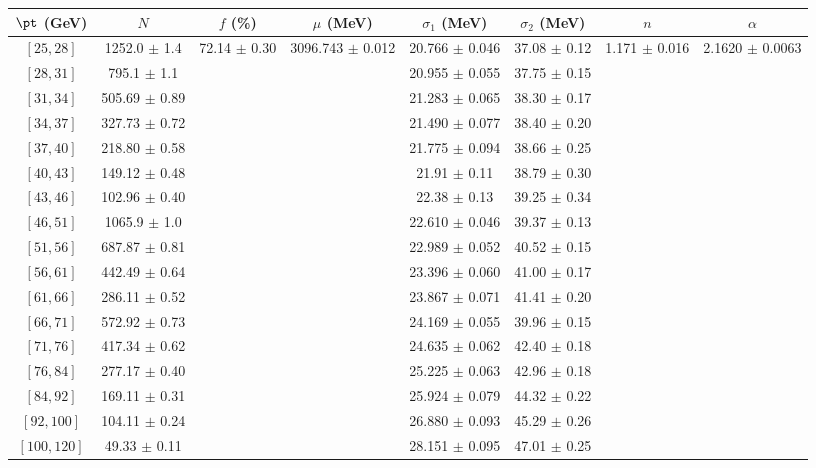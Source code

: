 \begin{tabular}{c||c|c|c|c|c|c|c}
$\pt$ (GeV) & $N$ & $f$ (\%) & $\mu$ (MeV) & $\sigma_1$ (MeV) & $\sigma_2$ (MeV) & $n$ & $\alpha$ \\
\hline
$[25, 28]$ & 1252.0 $\pm$ 1.4 & \multirow{17}{*}{72.14 $\pm$ 0.30} & \multirow{17}{*}{3096.743 $\pm$ 0.012} & 20.766 $\pm$ 0.046 & 37.08 $\pm$ 0.12 & \multirow{17}{*}{1.171 $\pm$ 0.016} & \multirow{17}{*}{2.1620 $\pm$ 0.0063}\\
$[28, 31]$ & 795.1 $\pm$ 1.1 &  &  & 20.955 $\pm$ 0.055 & 37.75 $\pm$ 0.15 &  & \\
$[31, 34]$ & 505.69 $\pm$ 0.89 &  &  & 21.283 $\pm$ 0.065 & 38.30 $\pm$ 0.17 &  & \\
$[34, 37]$ & 327.73 $\pm$ 0.72 &  &  & 21.490 $\pm$ 0.077 & 38.40 $\pm$ 0.20 &  & \\
$[37, 40]$ & 218.80 $\pm$ 0.58 &  &  & 21.775 $\pm$ 0.094 & 38.66 $\pm$ 0.25 &  & \\
$[40, 43]$ & 149.12 $\pm$ 0.48 &  &  & 21.91 $\pm$ 0.11 & 38.79 $\pm$ 0.30 &  & \\
$[43, 46]$ & 102.96 $\pm$ 0.40 &  &  & 22.38 $\pm$ 0.13 & 39.25 $\pm$ 0.34 &  & \\
$[46, 51]$ & 1065.9 $\pm$ 1.0 &  &  & 22.610 $\pm$ 0.046 & 39.37 $\pm$ 0.13 &  & \\
$[51, 56]$ & 687.87 $\pm$ 0.81 &  &  & 22.989 $\pm$ 0.052 & 40.52 $\pm$ 0.15 &  & \\
$[56, 61]$ & 442.49 $\pm$ 0.64 &  &  & 23.396 $\pm$ 0.060 & 41.00 $\pm$ 0.17 &  & \\
$[61, 66]$ & 286.11 $\pm$ 0.52 &  &  & 23.867 $\pm$ 0.071 & 41.41 $\pm$ 0.20 &  & \\
$[66, 71]$ & 572.92 $\pm$ 0.73 &  &  & 24.169 $\pm$ 0.055 & 39.96 $\pm$ 0.15 &  & \\
$[71, 76]$ & 417.34 $\pm$ 0.62 &  &  & 24.635 $\pm$ 0.062 & 42.40 $\pm$ 0.18 &  & \\
$[76, 84]$ & 277.17 $\pm$ 0.40 &  &  & 25.225 $\pm$ 0.063 & 42.96 $\pm$ 0.18 &  & \\
$[84, 92]$ & 169.11 $\pm$ 0.31 &  &  & 25.924 $\pm$ 0.079 & 44.32 $\pm$ 0.22 &  & \\
$[92, 100]$ & 104.11 $\pm$ 0.24 &  &  & 26.880 $\pm$ 0.093 & 45.29 $\pm$ 0.26 &  & \\
$[100, 120]$ & 49.33 $\pm$ 0.11 &  &  & 28.151 $\pm$ 0.095 & 47.01 $\pm$ 0.25 &  & \\
\end{tabular}
